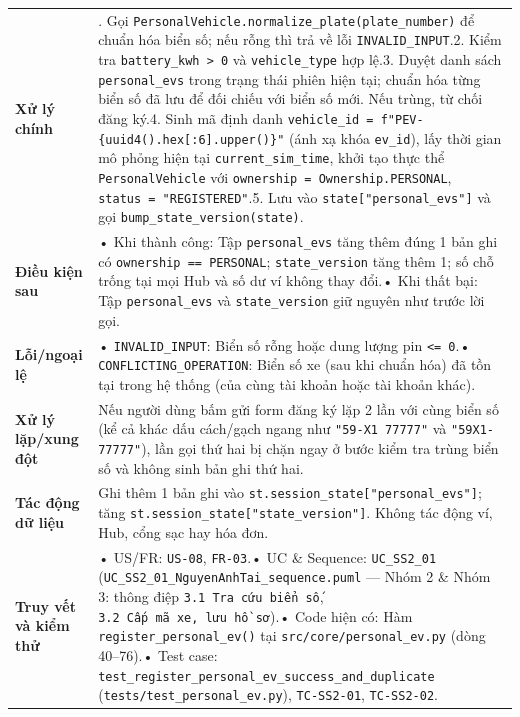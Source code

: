 \documentclass[11pt,a4paper]{article}
\begin{document}
\begin{longtable}[]{@{}
  >{\raggedright\arraybackslash}p{}
  >{\raggedright\arraybackslash}p{}@{}}
\textbf{Xử lý chính} & 1. Gọi
\texttt{PersonalVehicle.normalize\_plate(plate\_number)} để chuẩn hóa
biển số; nếu rỗng thì trả về lỗi \texttt{INVALID\_INPUT}.2. Kiểm tra
\texttt{battery\_kwh\ \textgreater{}\ 0} và \texttt{vehicle\_type} hợp
lệ.3. Duyệt danh sách \texttt{personal\_evs} trong trạng thái phiên hiện
tại; chuẩn hóa từng biển số đã lưu để đối chiếu với biển số mới. Nếu
trùng, từ chối đăng ký.4. Sinh mã định danh
\texttt{vehicle\_id\ =\ f"PEV-\{uuid4().hex{[}:6{]}.upper()\}"} (ánh xạ
khóa \texttt{ev\_id}), lấy thời gian mô phỏng hiện tại
\texttt{current\_sim\_time}, khởi tạo thực thể \texttt{PersonalVehicle}
với \texttt{ownership\ =\ Ownership.PERSONAL},
\texttt{status\ =\ "REGISTERED"}.5. Lưu vào
\texttt{state{[}"personal\_evs"{]}} và gọi
\texttt{bump\_state\_version(state)}. \\
\textbf{Điều kiện sau} & • Khi thành công: Tập \texttt{personal\_evs}
tăng thêm đúng 1 bản ghi có \texttt{ownership\ ==\ PERSONAL};
\texttt{state\_version} tăng thêm 1; số chỗ trống tại mọi Hub và số dư
ví không thay đổi.• Khi thất bại: Tập \texttt{personal\_evs} và
\texttt{state\_version} giữ nguyên như trước lời gọi. \\
\textbf{Lỗi/ngoại lệ} & • \texttt{INVALID\_INPUT}: Biển số rỗng hoặc
dung lượng pin \texttt{\textless{}=\ 0}.•
\texttt{CONFLICTING\_OPERATION}: Biển số xe (sau khi chuẩn hóa) đã tồn
tại trong hệ thống (của cùng tài khoản hoặc tài khoản khác). \\
\textbf{Xử lý lặp/xung đột} & Nếu người dùng bấm gửi form đăng ký lặp 2
lần với cùng biển số (kể cả khác dấu cách/gạch ngang như
\texttt{"59-X1\ 77777"} và \texttt{"59X1-77777"}), lần gọi thứ hai bị
chặn ngay ở bước kiểm tra trùng biển số và không sinh bản ghi thứ
hai. \\
\textbf{Tác động dữ liệu} & Ghi thêm 1 bản ghi vào
\texttt{st.session\_state{[}"personal\_evs"{]}}; tăng
\texttt{st.session\_state{[}"state\_version"{]}}. Không tác động ví,
Hub, cổng sạc hay hóa đơn. \\
\textbf{Truy vết và kiểm thử} & • US/FR: \texttt{US-08},
\texttt{FR-03}.• UC \& Sequence: \texttt{UC\_SS2\_01}
(\texttt{UC\_SS2\_01\_NguyenAnhTai\_sequence.puml} --- Nhóm 2 \& Nhóm 3:
thông điệp \texttt{3.1\ Tra\ cứu\ biển\ số},
\texttt{3.2\ Cấp\ mã\ xe,\ lưu\ hồ\ sơ}).• Code hiện có: Hàm
\texttt{register\_personal\_ev()} tại \texttt{src/core/personal\_ev.py}
(dòng 40--76).• Test case:
\texttt{test\_register\_personal\_ev\_success\_and\_duplicate}
(\texttt{tests/test\_personal\_ev.py}), \texttt{TC-SS2-01},
\texttt{TC-SS2-02}. \\
\end{longtable}
\end{document}
